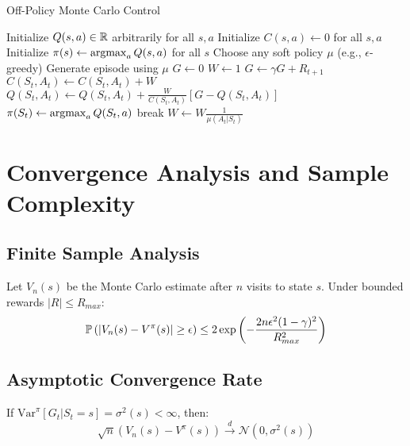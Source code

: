 \begin{algorithm}
\caption{Off-Policy Monte Carlo Control}
\begin{algorithmic}
\STATE Initialize $Q(s,a) \in \mathbb{R}$ arbitrarily for all $s,a$
\STATE Initialize $C(s,a) \leftarrow 0$ for all $s,a$
\STATE Initialize $\pi(s) \leftarrow \operatorname*{argmax}_a Q(s,a)$ for all $s$
\REPEAT
    \STATE Choose any soft policy $\mu$ (e.g., $\epsilon$-greedy)
    \STATE Generate episode using $\mu$
    \STATE $G \leftarrow 0$
    \STATE $W \leftarrow 1$
        \STATE $G \leftarrow \gamma G + R_{t+1}$
        \STATE $C(S_t, A_t) \leftarrow C(S_t, A_t) + W$
        \STATE $Q(S_t, A_t) \leftarrow Q(S_t, A_t) + \frac{W}{C(S_t, A_t)}[G - Q(S_t, A_t)]$
        \STATE $\pi(S_t) \leftarrow \operatorname*{argmax}_a Q(S_t, a)$
            \STATE break
        \ENDIF
        \STATE $W \leftarrow W \frac{1}{\mu(A_t|S_t)}$
    \ENDFOR
{}
\end{algorithmic}
\end{algorithm}

\section{Convergence Analysis and Sample Complexity}

\subsection{Finite Sample Analysis}

\begin{theorem}
Let $V_n(s)$ be the Monte Carlo estimate after $n$ visits to state $s$. Under bounded rewards $|R| \leq R_{max}$:
\begin{equation}
\mathbb{P}\left(|V_n(s) - V^\pi(s)| \geq \epsilon\right) \leq 2\exp\left(-\frac{2n\epsilon^2(1-\gamma)^2}{R_{max}^2}\right)
\end{equation}
\end{theorem}

\subsection{Asymptotic Convergence Rate}

\begin{theorem}
If $\text{Var}^\pi[G_t | S_t = s] = \sigma^2(s) < \infty$, then:
\begin{equation}
\sqrt{n}(V_n(s) - V^\pi(s)) \xrightarrow{d} \mathcal{N}(0, \sigma^2(s))
\end{equation}
\end{theorem}

